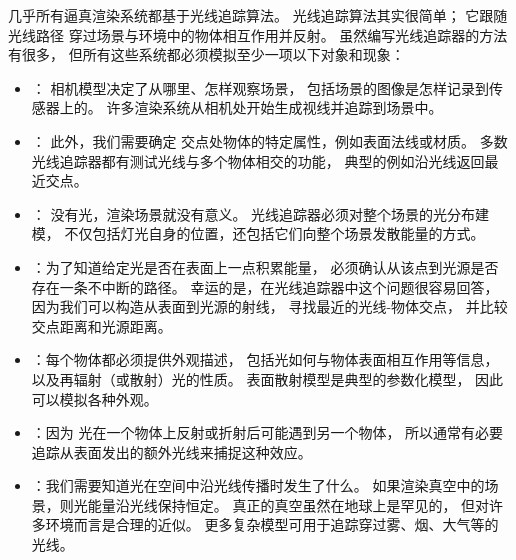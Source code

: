 几乎所有逼真渲染系统都基于光线追踪算法。
光线追踪算法其实很简单；
它跟随光线路径
穿过场景与环境中的物体相互作用并反射。
虽然编写光线追踪器的方法有很多，
但所有这些系统都必须模拟至少一项以下对象和现象：
\begin{itemize}
    \item {}： 相机模型决定了从哪里、怎样观察场景，
          包括场景的图像是怎样记录到传感器上的。
          许多渲染系统从相机处开始生成视线并追踪到场景中。
    \item {}： 此外，我们需要确定
          交点处物体的特定属性，例如表面法线或材质。
          多数光线追踪器都有测试光线与多个物体相交的功能，
          典型的例如沿光线返回最近交点。
    \item {}： 没有光，渲染场景就没有意义。
          光线追踪器必须对整个场景的光分布建模，
          不仅包括灯光自身的位置，还包括它们向整个场景发散能量的方式。
    \item {}：为了知道给定光是否在表面上一点积累能量，
          必须确认从该点到光源是否存在一条不中断的路径。
          幸运的是，在光线追踪器中这个问题很容易回答，
          因为我们可以构造从表面到光源的射线，
          寻找最近的光线-物体交点，
          并比较交点距离和光源距离。
    \item {}：每个物体都必须提供外观描述，
          包括光如何与物体表面相互作用等信息，
          以及再辐射（或散射）光的性质。
          表面散射模型是典型的参数化模型，
          因此可以模拟各种外观。
    \item {}：因为
          光在一个物体上反射或折射后可能遇到另一个物体，
          所以通常有必要追踪从表面发出的额外光线来捕捉这种效应。
    \item {}：我们需要知道光在空间中沿光线传播时发生了什么。
          如果渲染真空中的场景，则光能量沿光线保持恒定。
          真正的真空虽然在地球上是罕见的，
          但对许多环境而言是合理的近似。
          更多复杂模型可用于追踪穿过雾、烟、大气等的光线。
\end{itemize}

